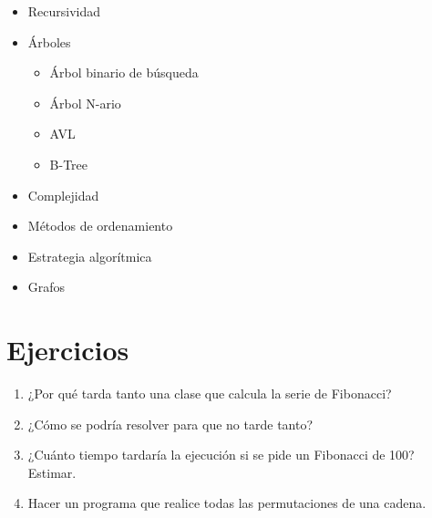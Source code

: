 \documentclass[a4paper]{report}
\begin{document}
            \begin{itemize}
                \item Recursividad
                \item Árboles
                    \begin{itemize}
                        \item Árbol binario de búsqueda
                        \item Árbol N-ario
                        \item AVL
                        \item B-Tree
                    \end{itemize}
                \item Complejidad
                \item Métodos de ordenamiento
                \item Estrategia algorítmica
                \item Grafos
            \end{itemize}

        \section{Ejercicios}

            \begin{enumerate}
                \item ¿Por qué tarda tanto una clase que calcula la serie de Fibonacci?
                \item ¿Cómo se podría resolver para que no tarde tanto?
                \item ¿Cuánto tiempo tardaría la ejecución si se pide un Fibonacci de 100? Estimar.
                \item Hacer un programa que realice todas las permutaciones de una cadena.
            \end{enumerate}
\end{document}
